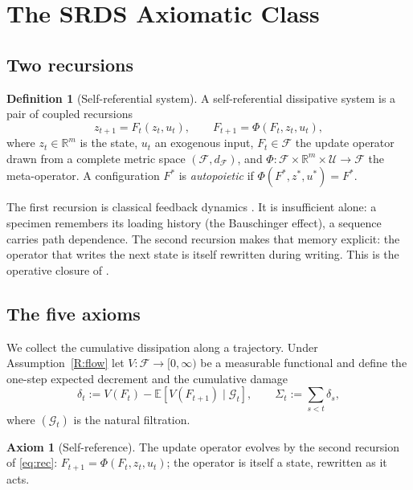 \documentclass[11pt]{article}
\theoremstyle{plain}
\theoremstyle{definition}
\newtheorem{definition}[theorem]{Definition}
\newtheorem{axiom}{Axiom}
\theoremstyle{remark}
\newcommand{\R}{\mathbb{R}}
\newcommand{\E}{\mathbb{E}}
\begin{document}
\section{The SRDS Axiomatic Class}\label{sec:axioms}

\subsection{Two recursions}

\begin{definition}[Self-referential system]\label{def:srds}
A self-referential dissipative system is a pair of coupled recursions
\begin{equation}\label{eq:rec}
z_{t+1}=F_t(z_t,u_t),\qquad F_{t+1}=\Phi(F_t,z_t,u_t),
\end{equation}
where $z_t\in\R^m$ is the state, $u_t$ an exogenous input, $F_t\in\mathcal F$ the update operator drawn from a complete metric space $(\mathcal F,d_{\mathcal F})$, and $\Phi:\mathcal F\times\R^m\times\mathcal U\to\mathcal F$ the meta-operator. A configuration $F^*$ is \emph{autopoietic} if $\Phi(F^*,z^*,u^*)=F^*$.
\end{definition}

The first recursion is classical feedback dynamics \citep{wiener1948,ashby1956}. It is insufficient alone: a specimen remembers its loading history (the Bauschinger effect), a sequence carries path dependence. The second recursion makes that memory explicit: the operator that writes the next state is itself rewritten during writing. This is the operative closure of \citep{maturana1980}.

\subsection{The five axioms}

We collect the cumulative dissipation along a trajectory. Under Assumption~\ref{R:flow} let $V:\mathcal F\to[0,\infty)$ be a measurable functional and define the one-step expected decrement and the cumulative damage
\begin{equation}\label{eq:damage}
\delta_t:=V(F_t)-\E\!\left[V(F_{t+1})\mid \mathcal G_t\right],\qquad
\Sigma_t:=\sum_{s<t}\delta_s,
\end{equation}
where $(\mathcal G_t)$ is the natural filtration.

\begin{axiom}[Self-reference]\label{ax:self}
The update operator evolves by the second recursion of \eqref{eq:rec}: $F_{t+1}=\Phi(F_t,z_t,u_t)$; the operator is itself a state, rewritten as it acts.
\end{axiom}
\end{document}
